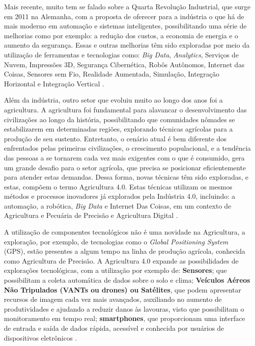 \documentclass[12pt]{article}
\begin{document}
Mais recente, muito tem se falado sobre a Quarta Revolução Industrial, que surge em 2011 na Alemanha, com a proposta de oferecer para a indústria o que há de mais moderno em automação e sistemas inteligentes, possibilitando uma série de melhorias como por exemplo: a redução dos custos, a economia de energia e o aumento da segurança. Essas e outras melhorias têm sido exploradas por meio da utilização de ferramentas e tecnologias como: \textit{Big Data}, \textit{Analytics}, Serviços de Nuvem, Impressões 3D, Segurança Cibernética, Robôs Autônomos, Internet das Coisas, Sensores sem Fio, Realidade Aumentada, Simulação, Integração Horizontal e Integração Vertical \cite{Souza:2017}.

Além da indústria, outro setor que evoluiu muito ao longo dos anos foi a agricultura. A agricultura foi fundamental para alavancar o desenvolvimento das civilizações ao longo da história, possibilitando que comunidades nômades se estabilizarem em determinadas regiões, explorando técnicas agrícolas para a produção de seu sustento. Entretanto, o cenário atual é bem diferente dos enfrentados pelas primeiras civilizações, o crescimento populacional, e a tendência das pessoas a se tornarem cada vez mais exigentes com o que é consumido, gera um grande desafio para o setor agrícola, que precisa se posicionar eficientemente para atender estas demandas. Dessa forma, novas técnicas têm sido exploradas, e estas, compõem o termo Agricultura 4.0. Estas técnicas utilizam os mesmos métodos e processos inovadores já explorados pela Indústria 4.0, incluindo: a automação, a robótica, \textit{Big Data} e Internet Das Coisas, em um contexto de Agricultura e Pecuária de Precisão e Agricultura Digital \cite{Ribeiro:2018}.

A utilização de componentes tecnológicos não é uma novidade na Agricultura, a exploração, por exemplo, de tecnologias como o \textit{Global Positioning System} (GPS), estão presentes a algum tempo na linha de produção agrícola, conhecida como Agricultura de Precisão. A Agricultura 4.0 expande as possibilidades de explorações tecnológicas, com a utilização por exemplo de: \textbf{Sensores}; que possibilitam a coleta automática de dados sobre o solo e clima; \textbf{Veículos Aéreos Não Tripulados (VANTs ou drones) ou Satélites}, que podem apresentar recursos de imagem cada vez mais avançados, auxiliando no aumento de produtividades e ajudando a reduzir danos às lavouras, visto que possibilitam o monitoramento em tempo real; \textbf{smartphones}, que proporcionam uma interface de entrada e saída de dados rápida, acessível e conhecida por usuários de dispositivos eletrônicos \cite{Shepherd:2018}.
\end{document}
